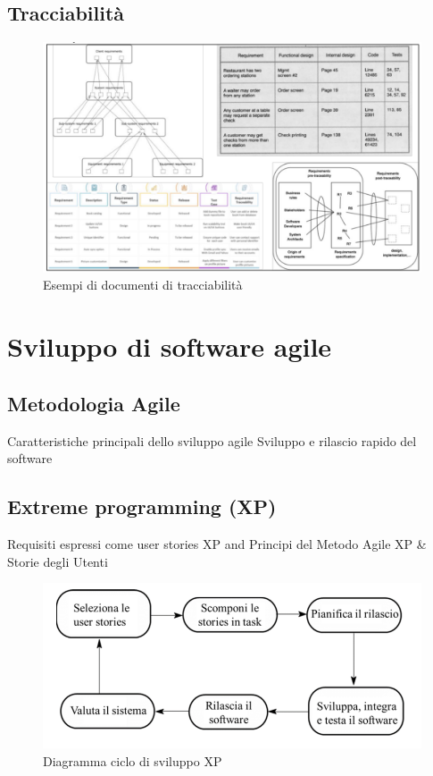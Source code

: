 \documentclass{article}
\begin{document}
	\subsection{Tracciabilità}
	\begin{figure}[h]
		\centering
		\includegraphics[scale=0.4]{19.ex_doc_tracc.png}
		\caption{Esempi di documenti di tracciabilità}
		\label{fig:im-19}
	\end{figure}
	
	\section{Sviluppo di software agile}
	\subsection{Metodologia Agile}
	Caratteristiche principali dello sviluppo agile
	Sviluppo e rilascio rapido del software
	\subsection{Extreme programming (XP)}
	Requisiti espressi come user stories
	XP and Principi del Metodo Agile
	XP \& Storie degli Utenti
	\begin{figure}[h]
		\centering
		\includegraphics[scale=0.3]{20.diag_XP.png}
		\caption{Diagramma ciclo di sviluppo XP}
		\label{fig:im-20}
	\end{figure}
\end{document}
